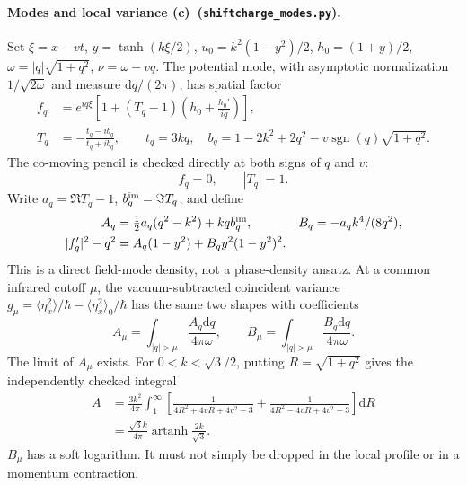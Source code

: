 \documentclass[11pt,a4paper]{article}
\newcommand{\C}{\textbf{(c)}\ }
\newcommand{\dd}{\mathrm d}
\newcommand{\file}[1]{\nolinkurl{#1}}
\newcommand{\modes}{\file{shiftcharge_modes.py}}
\begin{document}
\paragraph{Modes and local variance \C (\modes).}
Set $\xi=x-vt$, $y=\tanh(k\xi/2)$, $u_0=k^2(1-y^2)/2$,
$h_0=(1+y)/2$, $\omega=|q|\sqrt{1+q^2}$, $\nu=\omega-vq$. The potential
mode, with asymptotic normalization $1/\sqrt{2\omega}$ and measure
$\dd q/(2\pi)$, has spatial factor
\begin{align}
 f_q&=e^{iq\xi}\left[1+(T_q-1)
                  \left(h_0+\frac{h_0'}{iq}\right)\right],\\
 T_q&=-\frac{t_q-i b_q}{t_q+i b_q},\qquad
 t_q=3kq,\quad b_q=1-2k^2+2q^2-v\operatorname{sgn}(q)\sqrt{1+q^2}.
\end{align}
The co-moving pencil is checked directly at both signs of $q$ and $v$:
\begin{equation}
 [\partial_\xi^4-k^2\partial_\xi^2
    +6\partial_\xi(u_0\partial_\xi)
    +2iv\nu\partial_\xi-\nu^2]f_q=0,\qquad |T_q|=1.
\end{equation}
Write $a_q=\Re T_q-1$, $b_q^{\rm im}=\Im T_q$, and define
\begin{align}
 A_q&=\tfrac12a_q(q^2-k^2)+kq b_q^{\rm im},&
 B_q&=-a_qk^4/(8q^2),\\
 |f_q'|^2-q^2&=A_q(1-y^2)+B_qy^2(1-y^2)^2.\label{density}
\end{align}
This is a direct field-mode density, not a phase-density ansatz.
At a common infrared cutoff $\mu$, the vacuum-subtracted coincident
variance $g_\mu=\langle\eta_x^2\rangle/\hbar-\langle\eta_x^2\rangle_0/\hbar$
has the same two shapes with coefficients
\begin{equation}
 A_\mu=\int_{|q|>\mu}\frac{A_q\dd q}{4\pi\omega},\qquad
 B_\mu=\int_{|q|>\mu}\frac{B_q\dd q}{4\pi\omega}.
\end{equation}
The limit of $A_\mu$ exists. For $0<k<\sqrt3/2$, putting
$R=\sqrt{1+q^2}$ gives the independently checked integral
\begin{align}
 A&=\frac{3k^2}{4\pi}\int_1^\infty
 \left[\frac1{4R^2+4vR+4v^2-3}
       +\frac1{4R^2-4vR+4v^2-3}\right]\dd R\\
 &=\frac{\sqrt3 k}{4\pi}\operatorname{artanh}\frac{2k}{\sqrt3}.
 \label{Aintegral}
\end{align}
$B_\mu$ has a soft logarithm. It must not simply be dropped in the local
profile or in a momentum contraction.
\end{document}
